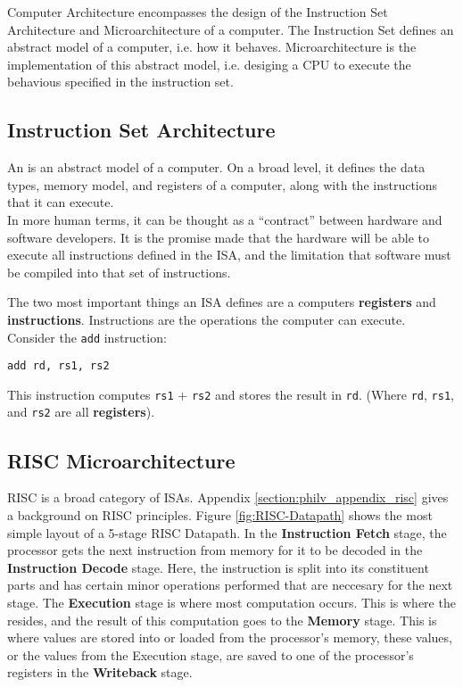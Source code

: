 
Computer Architecture encompasses the design of the Instruction Set Architecture and Microarchitecture of a computer. The Instruction Set defines an abstract model of a computer, i.e. how it behaves. Microarchitecture is the implementation of this abstract model, i.e. desiging a CPU to execute the behavious specified in the instruction set.



\subsection{Instruction Set Architecture}
    An  is an abstract model of a computer. On a broad level, it defines the data types, memory model, and registers of a computer, along with the instructions that it can execute. \\
    In more human terms, it can be thought as a ``contract'' between hardware and software developers. It is the promise made that the hardware will be able to execute all instructions defined in the \gls{ISA}, and the limitation that software must be compiled into that set of instructions.

    

    The two most important things an \gls{ISA} defines are a computers \textbf{registers} and \textbf{instructions}. Instructions are the operations the computer can execute. Consider the \texttt{add} instruction: 
    \begin{center}
    \texttt{add rd, rs1, rs2}
    \end{center}

    This instruction computes \texttt{rs1} $+$ \texttt{rs2} and stores the result in \texttt{rd}.  (Where \texttt{rd}, \texttt{rs1}, and \texttt{rs2} are all \textbf{registers}).
    

\subsection{RISC Microarchitecture}
    
    \gls{RISC} is a broad category of \glspl{ISA}. Appendix \ref{section:philv_appendix_risc} gives a background on RISC principles. Figure \ref{fig:RISC-Datapath} shows the most simple layout of a 5-stage \gls{RISC} Datapath. In the \textbf{Instruction Fetch} stage, the processor gets the next instruction from memory for it to be decoded in the \textbf{Instruction Decode} stage. Here, the instruction is split into its constituent parts and has certain minor operations performed that are neccesary for the next stage. The \textbf{Execution} stage is where most computation occurs. This is where the  resides, and the result of this computation goes to the \textbf{Memory} stage. This is where values are stored into or loaded from the processor's memory, these values, or the values from the Execution stage, are saved to one of the processor's registers in the \textbf{Writeback} stage. 
    
